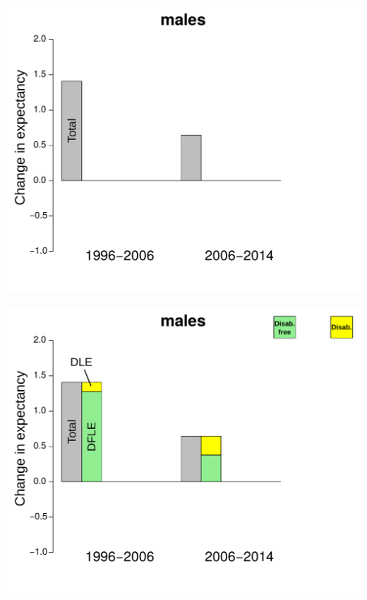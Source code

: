 \documentclass[20pt,usenames,dvipsnames]{beamer}
\begin{document}
\begin{frame}[plain]
\includegraphics[height=\textheight, keepaspectratio]{Figures/MalesDecAllEdu1.pdf}
\end{frame}
\begin{frame}[plain]
\includegraphics[height=\textheight, keepaspectratio]{Figures/MalesDecAllEdu2.pdf}
\end{frame}
\end{document}
